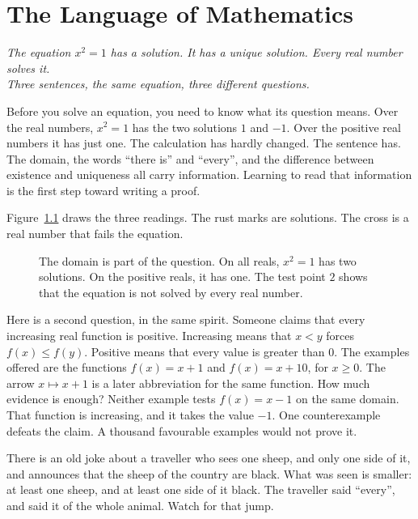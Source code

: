 \chapter{The Language of Mathematics}\label{ch:language}

\begin{center}\itshape
The equation $x^2=1$ has a solution. It has a unique solution. Every real number solves it.\\
Three sentences, the same equation, three different questions.
\end{center}

Before you solve an equation, you need to know what its question means. Over the real numbers, $x^2=1$ has the two solutions $1$ and $-1$. Over the positive real numbers it has just one. The calculation has hardly changed. The sentence has. The domain, the words ``there is'' and ``every'', and the difference between existence and uniqueness all carry information. Learning to read that information is the first step toward writing a proof.

Figure~\ref{fig:lang-domains} draws the three readings. The rust marks are solutions. The cross is a real number that fails the equation.

\begin{figure}[ht]
\centering
{}
\caption{The domain is part of the question. On all reals, $x^2=1$ has two solutions. On the positive reals, it has one. The test point $2$ shows that the equation is not solved by every real number.}
\label{fig:lang-domains}
\end{figure}

Here is a second question, in the same spirit. Someone claims that every increasing real function is positive. Increasing means that $x<y$ forces $f(x)\le f(y)$. Positive means that every value is greater than $0$. The examples offered are the functions $f(x)=x+1$ and $f(x)=x+10$, for $x\ge 0$. The arrow $x\mapsto x+1$ is a later abbreviation for the same function. How much evidence is enough? Neither example tests $f(x)=x-1$ on the same domain. That function is increasing, and it takes the value $-1$. One counterexample defeats the claim. A thousand favourable examples would not prove it.

There is an old joke about a traveller who sees one sheep, and only one side of it, and announces that the sheep of the country are black. What was seen is smaller: at least one sheep, and at least one side of it black. The traveller said ``every'', and said it of the whole animal. Watch for that jump.

